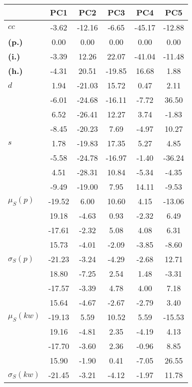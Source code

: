 \begin{table}[h!]
\begin{center}
\begin{tabular}{| l || c | c | c | c | c |}\hline
 & {\bf PC1} & {\bf PC2} & {\bf PC3} & {\bf PC4} & {\bf PC5} \\\hline\hline
{\bf $cc$} & -3.62 & -12.16 & -6.65 & -45.17 & -12.88 \\
{\bf (p.)} & 0.00 & 0.00 & 0.00 & 0.00 & 0.00 \\
{\bf (i.)} & -3.39 & 12.26 & 22.07 & -41.04 & -11.48 \\
{\bf (h.)} & -4.31 & 20.51 & -19.85 & 16.68 & 1.88 \\\hline
{\bf $d$} & 1.94 & -21.03 & 15.72 & 0.47 & 2.11 \\
{\bf } & -6.01 & -24.68 & -16.11 & -7.72 & 36.50 \\
{\bf } & 6.52 & -26.41 & 12.27 & 3.74 & -1.83 \\
{\bf } & -8.45 & -20.23 & 7.69 & -4.97 & 10.27 \\\hline
{\bf $s$} & 1.78 & -19.83 & 17.35 & 5.27 & 4.85 \\
{\bf } & -5.58 & -24.78 & -16.97 & -1.40 & -36.24 \\
 & 4.51  & -28.31  & 10.84  & -5.34  & -4.35 \\
 & -9.49  & -19.00  & 7.95  & 14.11  & -9.53 \\\hline
$\mu_S(p)$ & -19.52  & 6.00  & 10.60  & 4.15  & -13.06 \\
 & 19.18  & -4.63  & 0.93  & -2.32  & 6.49 \\
 & -17.61  & -2.32  & 5.08  & 4.08  & 6.31 \\
 & 15.73  & -4.01  & -2.09  & -3.85  & -8.60 \\\hline
$\sigma_S(p)$ & -21.23  & -3.24  & -4.29  & -2.68  & 12.71 \\
 & 18.80  & -7.25  & 2.54  & 1.48  & -3.31 \\
 & -17.57  & -3.39  & 4.78  & 4.00  & 7.18 \\
 & 15.64  & -4.67  & -2.67  & -2.79  & 3.40 \\\hline
$\mu_S(kw)$ & -19.13  & 5.59  & 10.52  & 5.59  & -15.53 \\
 & 19.16  & -4.81  & 2.35  & -4.19  & 4.13 \\
 & -17.70  & -3.60  & 2.36  & -0.96  & 8.85 \\
 & 15.90  & -1.90  & 0.41  & -7.05  & 26.55 \\\hline
$\sigma_S(kw)$ & -21.45  & -3.21  & -4.12  & -1.97  & 11.78 \\

\end{tabular}
\end{center}
\end{table}
